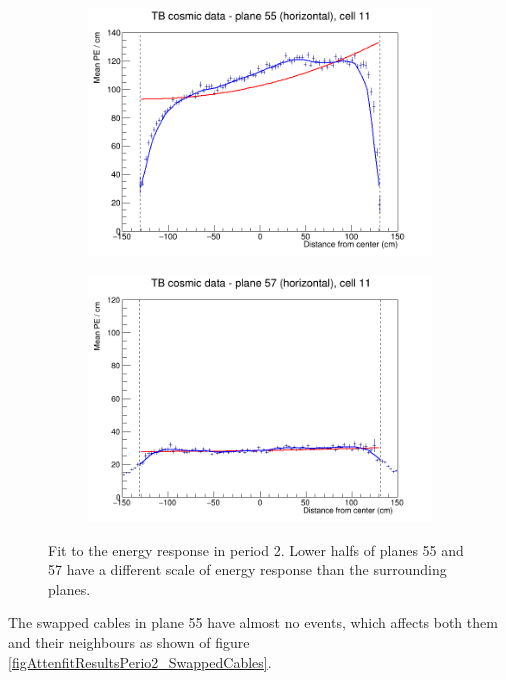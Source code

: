 \documentclass[12pt,a4paper]{article}
\begin{document}
\begin{figure}[h]
  \begin{subfigure}{0.5\textwidth}
    \includegraphics[width=\linewidth]{RelativeCalibrationResults/p2_055_011_extendedRange.png}
  \end{subfigure}
  \begin{subfigure}{0.5\textwidth}
    \includegraphics[width=\linewidth]{RelativeCalibrationResults/p2_057_011.png}
  \end{subfigure}
  \caption{Fit to the energy response in period 2. Lower halfs of planes 55 and 57 have a different scale of energy response than the surrounding planes.}
  \label{figAttenfitResultsPerio2_FaultyFEB}
\end{figure}

The swapped cables in plane 55 have almost no events, which affects both them and their neighbours as shown of figure \ref{figAttenfitResultsPerio2_SwappedCables}.
\end{document}
